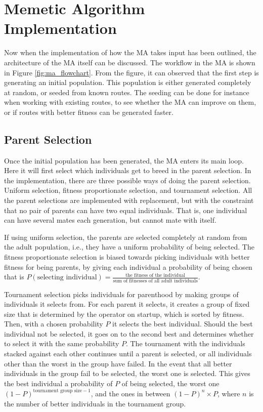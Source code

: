 
\section{Memetic Algorithm Implementation} %
\label{sec:memetic_algorithm_implementation}

Now when the implementation of how the MA takes input has been outlined, the architecture of the MA itself can be discussed. The workflow in the MA is shown in Figure \ref{fig:ma_flowchart}. From the figure, it can observed that the first step is generating an initial population. This population is either generated completely at random, or seeded from known routes. The seeding can be done for instance when working with existing routes, to see whether the MA can improve on them, or if routes with better fitness can be generated faster.

\subsection{Parent Selection} %
\label{sub:achitecture_parent_selection}

Once the initial population has been generated, the MA enters its main loop. Here it will first select which individuals get to breed in the parent selection. In the implementation, there are three possible ways of doing the parent selection. Uniform selection, fitness proportionate selection, and tournament selection. All the parent selections are implemented with replacement, but with the constraint that no pair of parents can have two equal individuals. That is, one individual can have several mates each generation, but cannot mate with itself.

If using uniform selection, the parents are selected completely at random from the adult population, i.e., they have a uniform probability of being selected. The fitness proportionate selection is biased towards picking individuals with better fitness for being parents, by giving each individual a probability of being chosen that is $P(\text{selecting individual}) = \frac{\text{the fitness of the individual}}{\text{sum of fitnesses of all adult individuals}}$.

Tournament selection picks individuals for parenthood by making groups of individuals it selects from. For each parent it selects, it creates a group of fixed size that is determined by the operator on startup, which is sorted by fitness. Then, with a chosen probability $P$ it selects the best individual. Should the best individual not be selected, it goes on to the second best and determines whether to select it with the same probability $P$. The tournament with the individuals stacked against each other continues until a parent is selected, or all individuals other than the worst in the group have failed. In the event that all better individuals in the group fail to be selected, the worst one is selected. This gives the best individual a probability of $P$ of being selected, the worst one $(1-P)^{\text{tournament group size}-1}$, and the ones in between $(1-P)^{n} \times P$, where $n$ is the number of better individuals in the tournament group.

